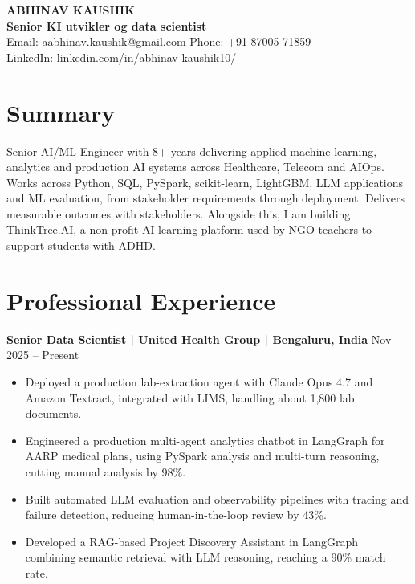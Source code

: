 \documentclass[10pt,a4paper]{article}
\newcommand{\role}[2]{\textbf{#1} \hfill #2\par}
\begin{document}
\begin{center}
  {\Large\bfseries ABHINAV KAUSHIK}\\[1pt]
  \textbf{Senior KI utvikler og data scientist}\\[1pt]
  Email: aabhinav.kaushik@gmail.com \quad Phone: +91 87005 71859\\
  LinkedIn: linkedin.com/in/abhinav-kaushik10/
\end{center}

\section{Summary}
Senior AI/ML Engineer with 8+ years delivering applied machine learning, analytics and production AI systems across Healthcare, Telecom and AIOps. Works across Python, SQL, PySpark, scikit-learn, LightGBM, LLM applications and ML evaluation, from stakeholder requirements through deployment. Delivers measurable outcomes with stakeholders. Alongside this, I am building ThinkTree.AI, a non-profit AI learning platform used by NGO teachers to support students with ADHD.

\section{Professional Experience}
\role{Senior Data Scientist | United Health Group | Bengaluru, India}{Nov 2025 -- Present}
\begin{itemize}
  \item Deployed a production lab-extraction agent with Claude Opus 4.7 and Amazon Textract, integrated with LIMS, handling about 1,800 lab documents.
  \item Engineered a production multi-agent analytics chatbot in LangGraph for AARP medical plans, using PySpark analysis and multi-turn reasoning, cutting manual analysis by 98\%.
  \item Built automated LLM evaluation and observability pipelines with tracing and failure detection, reducing human-in-the-loop review by 43\%.
  \item Developed a RAG-based Project Discovery Assistant in LangGraph combining semantic retrieval with LLM reasoning, reaching a 90\% match rate.
\end{itemize}
\vspace{3pt}
\end{document}
